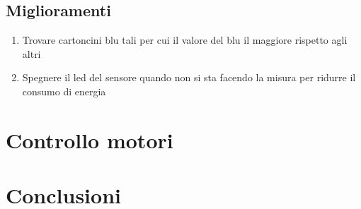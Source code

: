 \documentclass[a4paper,12pt]{report}
\begin{document}
\subsection{Miglioramenti}
\begin{enumerate}
    \item Trovare cartoncini blu tali per cui il valore del blu il maggiore rispetto agli altri
    \item Spegnere il led del sensore quando non si sta facendo la misura per ridurre il consumo di energia
\end{enumerate}
\section{Controllo motori}
\section{Conclusioni}
\end{document}
